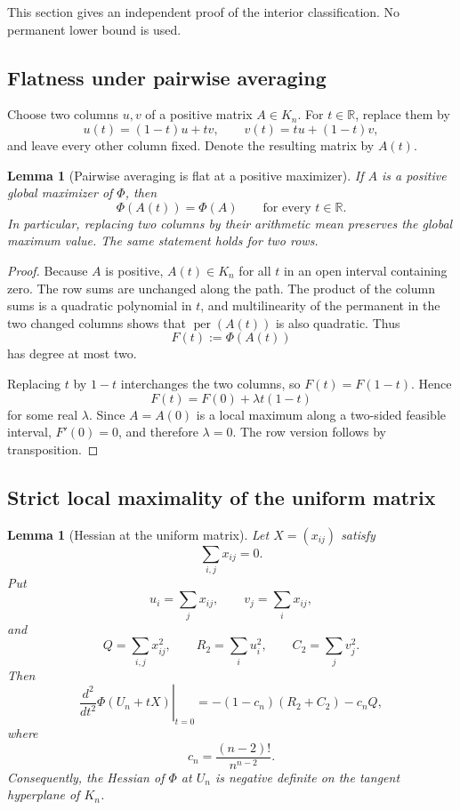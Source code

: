 \documentclass[11pt]{article}
\newtheorem{lemma}[theorem]{Lemma}
\theoremstyle{definition}
\newcommand{\per}{\operatorname{per}}
\newcommand{\1}{\mathbf{1}}
\begin{document}
This section gives an independent proof of the interior classification.  No permanent lower bound is used.

\subsection{Flatness under pairwise averaging}

Choose two columns $u,v$ of a positive matrix $A\in K_n$.  For $t\in\mathbb R$, replace them by
\[
 u(t)=(1-t)u+tv,
 \qquad
 v(t)=tu+(1-t)v,
 \tag{4.1}\label{eq:pair-path}
\]
and leave every other column fixed.  Denote the resulting matrix by $A(t)$.

\begin{lemma}[Pairwise averaging is flat at a positive maximizer]\label{lem:flat-average}
If $A$ is a positive global maximizer of $\Phi$, then
\[
 \Phi(A(t))=\Phi(A)
 \qquad\text{for every }t\in\mathbb R.
 \tag{4.2}\label{eq:flat-path}
\]
In particular, replacing two columns by their arithmetic mean preserves the global maximum value.  The same statement holds for two rows.
\end{lemma}

\begin{proof}
Because $A$ is positive, $A(t)\in K_n$ for all $t$ in an open interval containing zero.  The row sums are unchanged along the path.  The product of the column sums is a quadratic polynomial in $t$, and multilinearity of the permanent in the two changed columns shows that $\per(A(t))$ is also quadratic.  Thus
\[
 F(t):=\Phi(A(t))
\]
has degree at most two.

Replacing $t$ by $1-t$ interchanges the two columns, so $F(t)=F(1-t)$.  Hence
\[
 F(t)=F(0)+\lambda t(1-t)
\]
for some real $\lambda$.  Since $A=A(0)$ is a local maximum along a two-sided feasible interval, $F'(0)=0$, and therefore $\lambda=0$.  The row version follows by transposition.
\end{proof}

\subsection{Strict local maximality of the uniform matrix}

\begin{lemma}[Hessian at the uniform matrix]\label{lem:hessian}
Let $X=(x_{ij})$ satisfy
\[
 \sum_{i,j}x_{ij}=0.
\]
Put
\[
 u_i=\sum_jx_{ij},
 \qquad
 v_j=\sum_ix_{ij},
\]
and
\[
 Q=\sum_{i,j}x_{ij}^2,
 \qquad
 R_2=\sum_i u_i^2,
 \qquad
 C_2=\sum_jv_j^2.
\]
Then
\[
 \left.\frac{d^2}{dt^2}\Phi(U_n+tX)\right|_{t=0}
 =-(1-c_n)(R_2+C_2)-c_nQ,
 \tag{4.3}\label{eq:hessian}
\]
where
\[
 c_n=\frac{(n-2)!}{n^{n-2}}.
\]
Consequently, the Hessian of $\Phi$ at $U_n$ is negative definite on the tangent hyperplane of $K_n$.
\end{lemma}
\end{document}
